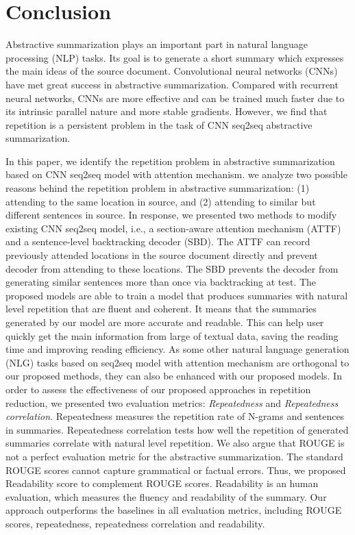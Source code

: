 \section{Conclusion}
\label{sec:conclude}
Abstractive summarization plays an important part in natural 
language processing (NLP) tasks.
Its goal is to generate a short summary which expresses the main ideas 
of the source document.
Convolutional neural networks (CNNs) have
met great success in abstractive summarization.
Compared with recurrent neural networks, 
CNNs are more effective and can be trained much faster due to 
its intrinsic parallel nature and more stable gradients.
However, we find that repetition is a persistent problem in the task of CNN seq2seq abstractive summarization. 

In this paper, we identify the repetition problem in abstractive summarization based on CNN seq2seq model with attention mechanism.
we analyze two possible reasons behind the repetition problem in abstractive
summarization: (1) attending to the same location in source,
and (2) attending to similar but different sentences in source. 
In response, 
we presented two methods to modify existing CNN seq2seq model, i.e.,
a section-aware attention mechanism (ATTF)
and a sentence-level backtracking decoder (SBD). 
The ATTF can record previously attended locations in the source document directly 
and prevent decoder from attending to these locations. 
The SBD prevents the decoder from generating similar sentences more than once via backtracking at test.
The proposed models are able to train a model that produces 
summaries with natural level repetition that are fluent and coherent. 
It means that the summaries generated by our model are more accurate and 
readable. This can help user quickly get the main information from large of textual data,
saving the reading time and improving reading efficiency.
As some other natural language generation (NLG) tasks based on seq2seq model with attention mechanism
are orthogonal to our proposed methods,
they can also be enhanced with our proposed models.
In order to assess the effectiveness of our proposed approaches in repetition reduction, 
we presented two evaluation metrics: \textit{Repeatedness} and \textit{Repeatedness correlation}.
Repeatedness measures the repetition rate of N-grams and sentences in summaries. 
Repeatedness correlation tests how well the repetition of generated summaries 
correlate with natural level repetition.
We also argue that ROUGE is not a perfect evaluation metric for the abstractive 
summarization. The standard ROUGE scores cannot capture grammatical or factual errors.
Thus, we proposed Readability score to complement ROUGE scores.
Readability is an human evaluation, which measures the fluency and readability of the
summary. 
Our approach outperforms the baselines in 
all evaluation metrics, including ROUGE scores, repeatedness, 
repeatedness correlation and readability.
